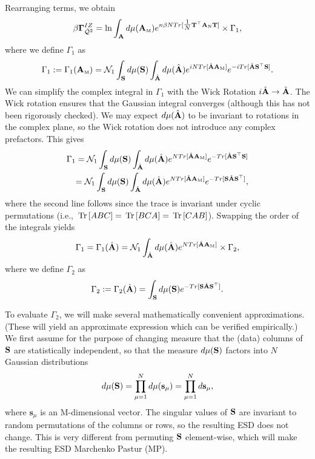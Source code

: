 Rearranging terms, we obtain 
\begin{align}
\label{eqn:IZG_Gamma1}
\beta\mathbf{\Gamma}^{IZ}_{\bar{\mathcal{Q}}^{2}} =  \ln\int_{\mathbf{A}}  d\mu({\mathbf{A}}_{\text{\tiny M}}) 
            e^{  n\beta N Tr[\tfrac{1}{N} {\mathbf{T}}^{\top}{\mathbf{A}}_{\text{\tiny N}}{\mathbf{T}} ] } \times
           \Gamma_1,
\end{align}
where we define $\Gamma_1$ as 
\begin{align}
\Gamma_1 := \Gamma_1({\mathbf{A}}_{\text{\tiny M}}) 
         = \mathcal{N}_1 \int_{{\mathbf{S}}} d\mu({\mathbf{S}}) 
                           \int_{\hat{\mathbf{A}}} d\mu(\hat{\mathbf{A}}) e^{ iN Tr[ \hat{\mathbf{A}}{\mathbf{A}}_{\text{\tiny M}} ] }
                                                           e^{ -i Tr[ \hat{\mathbf{A}}{\mathbf{S}}^{\top} {\mathbf{S}} ] } .
\end{align}
We can simplify the complex integral in $\Gamma_1$ with the Wick Rotation $i\hat{\mathbf{A}}\rightarrow\hat{\mathbf{A}}$.
The Wick rotation ensures that the Gaussian integral converges (although this has not been rigorously checked).
We may expect $d\mu(\hat{\mathbf{A}})$ to be invariant to rotations in the complex plane,
so the Wick rotation does not introduce any complex prefactors. This gives
\begin{eqnarray}
\label{eqn:QWick}
\Gamma_1 = \mathcal{N}_1 \int_{{\mathbf{S}}} d\mu({\mathbf{S}})\int_{\hat{\mathbf{A}}} d\mu(\hat{\mathbf{A}}) 
           e^{ N  Tr[ \hat{\mathbf{A}}{\mathbf{A}}_{\text{\tiny M}} ] }
           e^{ - Tr[ \hat{\mathbf{A}}{\mathbf{S}}^{\top} {\mathbf{S}}] } \\
\label{eqn:QWick2}
         = \mathcal{N}_1 \int_{{\mathbf{S}}} d\mu({\mathbf{S}})\int_{\hat{\mathbf{A}}} d\mu(\hat{\mathbf{A}}) 
           e^{ N  Tr[ \hat{\mathbf{A}}{\mathbf{A}}_{\text{\tiny M}} ] }
           e^{ -Tr[ {\mathbf{S}}\hat{\mathbf{A}}{\mathbf{S}}^{\top} ] } ,
\end{eqnarray}
where the second line follows since the trace is invariant under cyclic permutations (i.e., $\mbox{}\operatorname{Tr}\left[ABC\right]=\mbox{}\operatorname{Tr}\left[BCA\right]=\mbox{}\operatorname{Tr}\left[CAB\right]$).
Swapping the order of the integrals yields
\begin{eqnarray}
\label{eqn:QWick3}
\Gamma_1 =\Gamma_1(\hat{\mathbf{A}})  = \mathcal{N}_1
           \int_{\hat{\mathbf{A}}} d\mu(\hat{\mathbf{A}}) 
           e^{ N Tr[\hat{\mathbf{A}}{\mathbf{A}}_{\text{\tiny M}} ]}\times
           \Gamma_2  ,
\end{eqnarray}
where we define $\Gamma_2$ as
\begin{equation*}
\Gamma_2 := \Gamma_2(\hat{\mathbf{A}})
         = \int_{{\mathbf{S}}} d\mu({\mathbf{S}})
           e^{ -Tr[ {\mathbf{S}}\hat{\mathbf{A}}{\mathbf{S}}^{\top} ] } .
\end{equation*}

To evaluate $\Gamma_2$, we will make several mathematically convenient approximations.
(These will yield an approximate expression which can be verified empirically.)
%
We first assume for the purpose of changing measure that the (data) columns of ${\mathbf{S}}$ are
statistically independent, so that the measure $d\mu({\mathbf{S}})$ factors into $N$ Gaussian distributions
\begin{align}
\label{eqn:dMuS}
d\mu({\mathbf{S}}) = \prod_{\mu=1}^{N}d\mu(\mathbf{s}_{\mu})=\prod_{\mu=1}^{N}d\mathbf{s}_{\mu} ,
\end{align}
where $\mathbf{s}_{\mu}$ is an M-dimensional vector.
The singular values of ${\mathbf{S}}$ are invariant to random permutations of the columns or rows,
so the resulting ESD does not change.  
This is very different from permuting ${\mathbf{S}}$ element-wise, which will make the resulting ESD Marchenko Pastur (MP).

